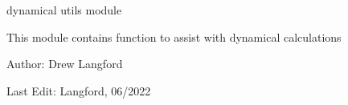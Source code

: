 \documentclass[letterpaper,10pt,english]{sphinxmanual}
\begin{document}
\sphinxstepscope


\section{}
\label{\detokenize{models:module-pyraa}}\label{\detokenize{models:pyraa-models-py}}\label{\detokenize{models:models}}\label{\detokenize{models::doc}}\label{\detokenize{models:module-pyraa.models}}
\sphinxAtStartPar
dynamical utils module 

\sphinxAtStartPar
This module contains function to assist with dynamical calculations

\sphinxAtStartPar
Author: Drew Langford

\sphinxAtStartPar
Last Edit: Langford, 06/2022
\end{document}
